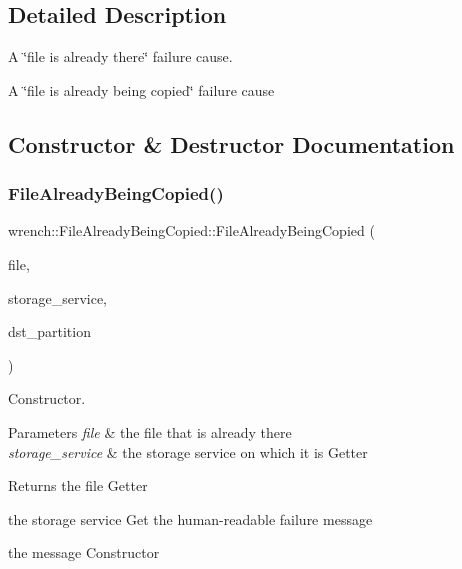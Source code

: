 \subsection{Detailed Description}
A \char`\"{}file is already there\char`\"{} failure cause. 

A \char`\"{}file is already being copied\char`\"{} failure cause 

\subsection{Constructor \& Destructor Documentation}
\mbox{\label{classwrench_1_1_file_already_being_copied_ae64320ee14267cee48463eca2f902a0f}} 
\subsubsection{\texorpdfstring{File\+Already\+Being\+Copied()}{FileAlreadyBeingCopied()}}
{\footnotesize\ttfamily wrench\+::\+File\+Already\+Being\+Copied\+::\+File\+Already\+Being\+Copied (\begin{DoxyParamCaption}\item[{\hyperlink{classwrench_1_1_workflow_file}{Workflow\+File} $\ast$}]{file,  }\item[{\hyperlink{classwrench_1_1_storage_service}{Storage\+Service} $\ast$}]{storage\+\_\+service,  }\item[{std\+::string}]{dst\+\_\+partition }\end{DoxyParamCaption})}



Constructor. 


\begin{DoxyParams}{Parameters}
{\em file} & the file that is already there \\
\hline
{\em storage\+\_\+service} & the storage service on which it is Getter \\
\hline
\end{DoxyParams}
\begin{DoxyReturn}{Returns}
the file Getter 

the storage service Get the human-\/readable failure message 

the message Constructor 
\end{DoxyReturn}

